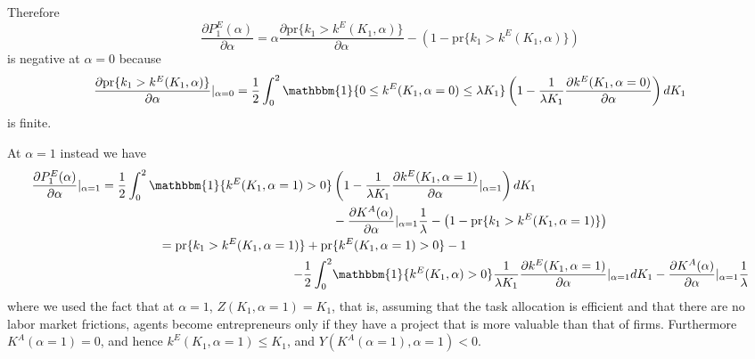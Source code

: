 \documentclass[12pt,american]{paper}
\theoremstyle{remark}
\begin{document}
Therefore
\[
\frac{\partial P^E_1(\alpha)}{\partial \alpha} = \alpha \frac{\partial \mbox{pr}\{k_1>k^E(K_1,\alpha) \}}{\partial \alpha} - (1-\mbox{pr}\{k_1>k^E(K_1,\alpha) \})  
\]
is negative at $\alpha=0$ because 
$$\frac{\partial \mbox{pr}\{k_1>k^E(K_1,\alpha) \}}{\partial \alpha}|_{\alpha=0} =\frac{1}{2} \int_0^2  \mathbbm{1}\{0\leq k^E(K_1,\alpha=0)\leq \lambda K_1\} \left( 1- \frac{1}{\lambda K_1} \frac{\partial k^E(K_1,\alpha=0)}{\partial \alpha} \right)  dK_1 $$ is finite.


At $\alpha=1$ instead we have
{\footnotesize
\begin{align*}
\frac{\partial P^E_1(\alpha)}{\partial \alpha}|_{\alpha=1}  =  \frac{1}{2}  \int_0^2  \mathbbm{1}\{ k^E(K_1,\alpha=1)>0\}  & \left( 1- \frac{1}{\lambda K_1} \frac{\partial k^E(K_1,\alpha=1)}{\partial \alpha}|_{\alpha=1} \right) dK_1 \\ & - \frac{\partial K^A(\alpha)}{\partial \alpha}|_{\alpha=1}  \frac{1}{\lambda}  - \left(1-\mbox{pr}\{k_1>k^E(K_1,\alpha=1) \}\right) \\ 
= \mbox{pr} \{k_1>k^E(K_1,\alpha=1) \} +\mbox{pr} & \{k^E(K_1,\alpha=1) > 0\} -1   
\\ -  \frac{1}{2} \int_0^2 &  \mathbbm{1}\{ k^E(K_1,\alpha)>0\} \frac{1}{\lambda K_1} \frac{\partial k^E(K_1,\alpha=1)}{\partial \alpha}|_{\alpha=1} dK_1   -\frac{\partial K^A(\alpha)}{\partial \alpha}|_{\alpha=1}  \frac{1}{\lambda}
\end{align*}}
where we used the fact that at $\alpha=1$, $Z(K_1,\alpha=1)=K_1$, that is, assuming that the task allocation is efficient and that there are no labor market frictions, agents become entrepreneurs only if they have a project that is more valuable than that of firms. Furthermore $K^A(\alpha=1)=0$, and hence $k^E(K_1,\alpha=1) \leq K_1$, and $Y(K^A(\alpha=1),\alpha=1)<0$.
\end{document}
